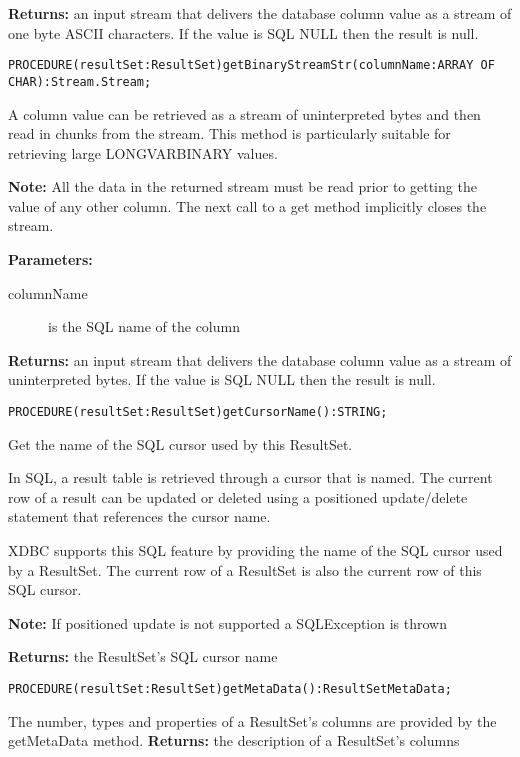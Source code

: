      {\bf Returns: } 
          an input stream that delivers the database column value as a stream of one byte ASCII characters. If the value is SQL
          NULL then the result is null. 


\verb'PROCEDURE(resultSet:ResultSet)getBinaryStreamStr(columnName:ARRAY OF CHAR):Stream.Stream;'

     A column value can be retrieved as a stream of uninterpreted bytes and then read in chunks from the stream. This method is
     particularly suitable for retrieving large LONGVARBINARY values. 

     {\bf Note: } All the data in the returned stream must be read prior to getting the value of any other column. The next call to a get method
     implicitly closes the stream. 

     {\bf Parameters: } 
\begin{description}
\item[columnName] is the SQL name of the column 
\end{description}

     {\bf Returns: } 
          an input stream that delivers the database column value as a stream of uninterpreted bytes. If the value is SQL NULL then
          the result is null. 


\verb'PROCEDURE(resultSet:ResultSet)getCursorName():STRING;'

     Get the name of the SQL cursor used by this ResultSet. 

     In SQL, a result table is retrieved through a cursor that is named. The current row of a result can be updated or deleted using a
     positioned update/delete statement that references the cursor name. 

     XDBC supports this SQL feature by providing the name of the SQL cursor used by a ResultSet. The current row of a ResultSet is also
     the current row of this SQL cursor. 

     {\bf Note: } If positioned update is not supported a SQLException is thrown 

     {\bf Returns: } 
          the ResultSet's SQL cursor name 


\verb'PROCEDURE(resultSet:ResultSet)getMetaData():ResultSetMetaData;'

     The number, types and properties of a ResultSet's columns are provided by the getMetaData method. 
     {\bf Returns: } 
          the description of a ResultSet's columns 

